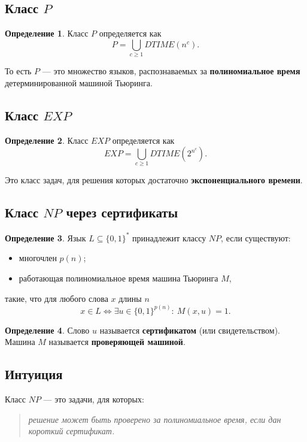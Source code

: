 \documentclass[12pt,a4paper]{article}
\theoremstyle{definition}
\newtheorem{definition}{Определение}[section]
\theoremstyle{plain}
\begin{document}
\subsection{Класс \texorpdfstring{$P$}{P}}
\begin{definition}
Класс $P$ определяется как
\[
P=\bigcup_{c\ge 1} DTIME(n^c).
\]
\end{definition}

То есть $P$ --- это множество языков, распознаваемых за \textbf{полиномиальное время} детерминированной машиной Тьюринга.

\subsection{Класс \texorpdfstring{$EXP$}{EXP}}
\begin{definition}
Класс $EXP$ определяется как
\[
EXP=\bigcup_{c\ge 1} DTIME(2^{n^c}).
\]
\end{definition}

Это класс задач, для решения которых достаточно \textbf{экспоненциального времени}.

\subsection{Класс \texorpdfstring{$NP$}{NP} через сертификаты}
\begin{definition}
Язык $L\subseteq\{0,1\}^*$ принадлежит классу $NP$, если существуют:
\begin{itemize}
\item многочлен $p(n)$;
\item работающая полиномиальное время машина Тьюринга $M$,
\end{itemize}
такие, что для любого слова $x$ длины $n$
\[
x\in L \iff \exists u\in\{0,1\}^{p(n)}:\ M(x,u)=1.
\]
\end{definition}

\begin{definition}
Слово $u$ называется \textbf{сертификатом} (или свидетельством). Машина $M$ называется \textbf{проверяющей машиной}.
\end{definition}

\subsection{Интуиция}
Класс $NP$ --- это задачи, для которых:
\begin{quote}
\emph{решение может быть проверено за полиномиальное время, если дан короткий сертификат.}
\end{quote}
\end{document}
